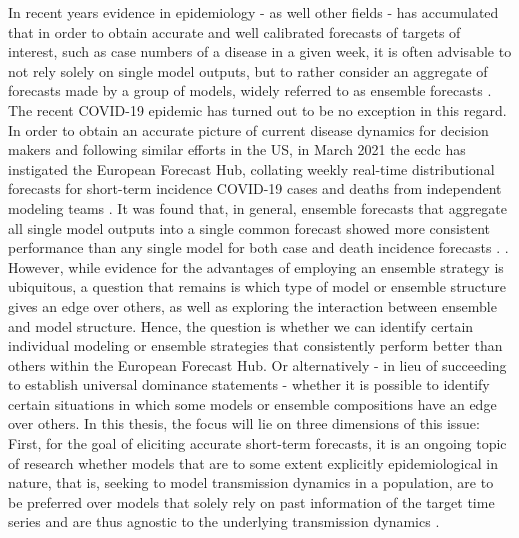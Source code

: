 In recent years evidence in epidemiology - as well other fields - has accumulated that in order to obtain accurate and well calibrated forecasts of targets of interest, such as case numbers of a disease in a given week, it is often advisable to not rely solely on single model outputs, but to rather consider an aggregate of forecasts made by a group of models, widely referred to as ensemble forecasts . \\
The recent COVID-19 epidemic has turned out to be no exception in this regard. In order to obtain an accurate picture of current disease dynamics for decision makers and following similar efforts in the US, in March 2021 the \ac{ecdc} has instigated the European Forecast Hub, collating weekly real-time distributional forecasts for short-term incidence COVID-19 cases and deaths from independent modeling teams \cite{noauthor_european_2021}. It was found that, in general, ensemble forecasts that aggregate all single model outputs into a single common forecast showed more consistent performance than any single model for both case and death incidence forecasts \cite{sherratt_draft_nodate}. . \\
However, while evidence for the advantages of employing an ensemble strategy is ubiquitous, %
 a question that remains %
is which type of model or ensemble structure gives an edge over others, as well as exploring the interaction between ensemble and model structure. Hence, the question is whether we can identify certain individual modeling or ensemble strategies that consistently perform better than others within the European Forecast Hub. Or alternatively - in lieu of succeeding to establish universal dominance statements - whether it is possible to identify certain situations in which some models or ensemble compositions have an edge over others. %
In this thesis, the focus will lie on three dimensions of this issue:\\
First, for the goal of eliciting accurate short-term forecasts, %
it is an ongoing topic of research whether models that are to some extent explicitly epidemiological in nature, that is, seeking to model transmission dynamics in a population, are to be preferred over models that solely rely on past information of the target time series and are thus agnostic to the underlying transmission dynamics \citep{funk_short-term_nodate}.  %
